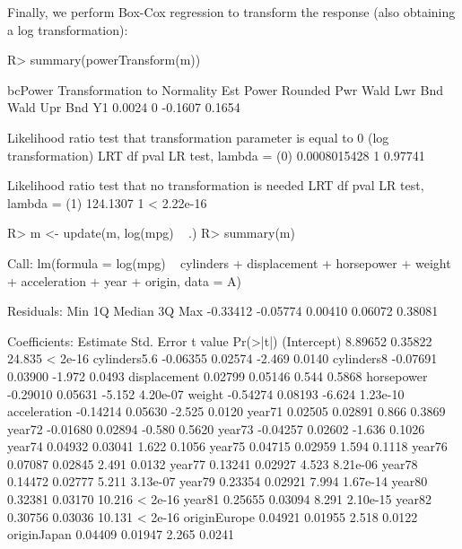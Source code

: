 \documentclass[
]{jss}
\begin{document}
Finally, we perform Box-Cox regression to transform the response (also
obtaining a log transformation):

\begin{CodeChunk}
\begin{CodeInput}
R> summary(powerTransform(m))
\end{CodeInput}
\begin{CodeOutput}
bcPower Transformation to Normality 
   Est Power Rounded Pwr Wald Lwr Bnd Wald Upr Bnd
Y1    0.0024           0      -0.1607       0.1654

Likelihood ratio test that transformation parameter is equal to 0
 (log transformation)
                               LRT df    pval
LR test, lambda = (0) 0.0008015428  1 0.97741

Likelihood ratio test that no transformation is needed
                           LRT df       pval
LR test, lambda = (1) 124.1307  1 < 2.22e-16
\end{CodeOutput}
\begin{CodeInput}
R> m <- update(m, log(mpg) ~ .)
R> summary(m)
\end{CodeInput}
\begin{CodeOutput}

Call:
lm(formula = log(mpg) ~ cylinders + displacement + horsepower + 
    weight + acceleration + year + origin, data = A)

Residuals:
     Min       1Q   Median       3Q      Max 
-0.33412 -0.05774  0.00410  0.06072  0.38081 

Coefficients:
             Estimate Std. Error t value Pr(>|t|)
(Intercept)   8.89652    0.35822  24.835  < 2e-16
cylinders5.6 -0.06355    0.02574  -2.469   0.0140
cylinders8   -0.07691    0.03900  -1.972   0.0493
displacement  0.02799    0.05146   0.544   0.5868
horsepower   -0.29010    0.05631  -5.152 4.20e-07
weight       -0.54274    0.08193  -6.624 1.23e-10
acceleration -0.14214    0.05630  -2.525   0.0120
year71        0.02505    0.02891   0.866   0.3869
year72       -0.01680    0.02894  -0.580   0.5620
year73       -0.04257    0.02602  -1.636   0.1026
year74        0.04932    0.03041   1.622   0.1056
year75        0.04715    0.02959   1.594   0.1118
year76        0.07087    0.02845   2.491   0.0132
year77        0.13241    0.02927   4.523 8.21e-06
year78        0.14472    0.02777   5.211 3.13e-07
year79        0.23354    0.02921   7.994 1.67e-14
year80        0.32381    0.03170  10.216  < 2e-16
year81        0.25655    0.03094   8.291 2.10e-15
year82        0.30756    0.03036  10.131  < 2e-16
originEurope  0.04921    0.01955   2.518   0.0122
originJapan   0.04409    0.01947   2.265   0.0241


\end{CodeOutput}
\end{CodeChunk}
\end{document}
